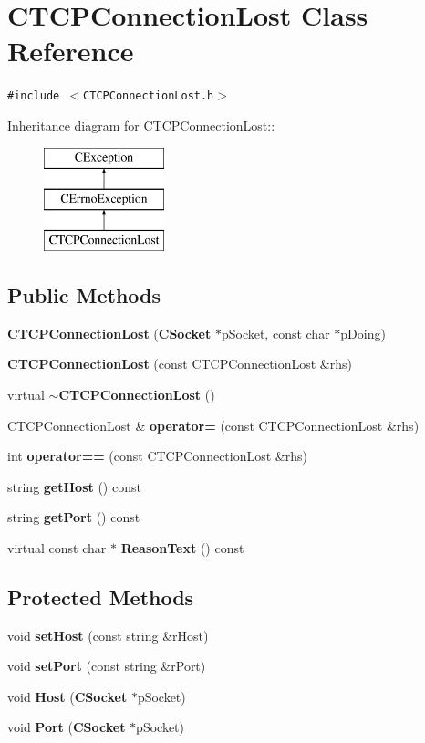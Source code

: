 \section{CTCPConnection\-Lost  Class Reference}
\label{classCTCPConnectionLost}
{\tt \#include $<$CTCPConnection\-Lost.h$>$}

Inheritance diagram for CTCPConnection\-Lost::\begin{figure}[H]
\begin{center}
\leavevmode
\includegraphics[height=3cm]{classCTCPConnectionLost}
\end{center}
\end{figure}
\subsection*{Public Methods}
\begin{CompactItemize}
\item 
{\bf CTCPConnection\-Lost} ({\bf CSocket} $\ast$p\-Socket, const char $\ast$p\-Doing)
\item 
{\bf CTCPConnection\-Lost} (const CTCPConnection\-Lost \&rhs)
\item 
virtual {\bf $\sim$CTCPConnection\-Lost} ()
\item 
CTCPConnection\-Lost \& {\bf operator=} (const CTCPConnection\-Lost \&rhs)
\item 
int {\bf operator==} (const CTCPConnection\-Lost \&rhs)
\item 
string {\bf get\-Host} () const
\item 
string {\bf get\-Port} () const
\item 
virtual const char $\ast$ {\bf Reason\-Text} () const
\end{CompactItemize}
\subsection*{Protected Methods}
\begin{CompactItemize}
\item 
void {\bf set\-Host} (const string \&r\-Host)
\item 
void {\bf set\-Port} (const string \&r\-Port)
\item 
void {\bf Host} ({\bf CSocket} $\ast$p\-Socket)
\item 
void {\bf Port} ({\bf CSocket} $\ast$p\-Socket)
\end{CompactItemize}
